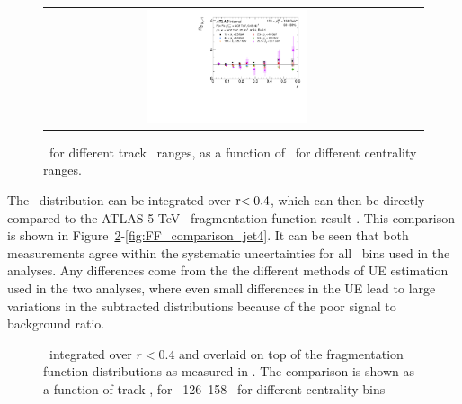 \begin{figure}
{\begin{tabular}{cc}
	 \includegraphics[width=0.45\textwidth]{figures_results/RDpT_final_ratio_dR_CONF_data_jet7_cent5} \\
\end{tabular} }
   \caption{\RDptr\ for different track \pt\ ranges, as a function of \rvar\ for different centrality ranges.}
      \label{fig:rdptcent}
\end{figure}


The \Rdptr\ distribution can be integrated over $ \rvar < 0.4 $, which can then be directly compared to the ATLAS 5 TeV \pbpb\ fragmentation function result \cite{ATLAS502FFConf}. This comparison is shown in Figure~\ref{fig:FF_comparison_jet1}-\ref{fig:FF_comparison_jet4}. It can be seen that both measurements agree within the systematic uncertainties for all \ptjet\ bins used in the analyses. Any differences come from the the different methods of UE estimation used in the two analyses, where even small differences in the UE lead to large variations in the subtracted distributions because of the poor signal to background ratio.

\begin{figure}
\caption{\Rdptr\ integrated over $ r < 0.4$ and overlaid on top of the fragmentation function distributions as measured in \cite{ATLAS502FFConf}. The comparison is shown as a function of track \pt, for \ptjet\ 126--158 \GeV\,  for different centrality bins }
\label{fig:FF_comparison_jet1}
\end{figure}

